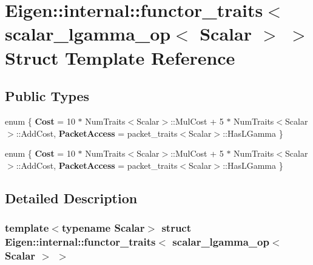 \hypertarget{struct_eigen_1_1internal_1_1functor__traits_3_01scalar__lgamma__op_3_01_scalar_01_4_01_4}{}\section{Eigen\+:\+:internal\+:\+:functor\+\_\+traits$<$ scalar\+\_\+lgamma\+\_\+op$<$ Scalar $>$ $>$ Struct Template Reference}
\label{struct_eigen_1_1internal_1_1functor__traits_3_01scalar__lgamma__op_3_01_scalar_01_4_01_4}
\subsection*{Public Types}
\begin{DoxyCompactItemize}
\item 
\mbox{\label{struct_eigen_1_1internal_1_1functor__traits_3_01scalar__lgamma__op_3_01_scalar_01_4_01_4_a9e1bb02bbc9aa7f5eab27eabd2a99a61}} 
enum \{ {\bfseries Cost} = 10 $\ast$ Num\+Traits$<$Scalar$>$\+:\+:Mul\+Cost + 5 $\ast$ Num\+Traits$<$Scalar$>$\+:\+:Add\+Cost, 
{\bfseries Packet\+Access} = packet\+\_\+traits$<$Scalar$>$\+:\+:Has\+L\+Gamma
 \}
\item 
\mbox{\label{struct_eigen_1_1internal_1_1functor__traits_3_01scalar__lgamma__op_3_01_scalar_01_4_01_4_ad8beb343e452b3035ec52ed645b5638e}} 
enum \{ {\bfseries Cost} = 10 $\ast$ Num\+Traits$<$Scalar$>$\+:\+:Mul\+Cost + 5 $\ast$ Num\+Traits$<$Scalar$>$\+:\+:Add\+Cost, 
{\bfseries Packet\+Access} = packet\+\_\+traits$<$Scalar$>$\+:\+:Has\+L\+Gamma
 \}
\end{DoxyCompactItemize}


\subsection{Detailed Description}
\subsubsection*{template$<$typename Scalar$>$\newline
struct Eigen\+::internal\+::functor\+\_\+traits$<$ scalar\+\_\+lgamma\+\_\+op$<$ Scalar $>$ $>$}



